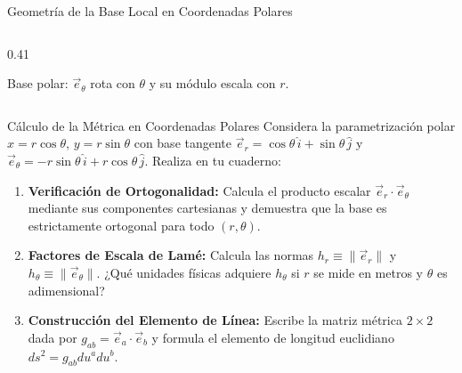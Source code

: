 \documentclass[10pt,aspectratio=169]{beamer}
\begin{document}
\begin{frame}{Geometría de la Base Local en Coordenadas Polares}
\begin{columns}[c]
\begin{column}{0.41\textwidth}
      \vspace{0.1cm}
      {\scriptsize Base polar: $\vec{e}_\theta$ rota con $\theta$ y su módulo escala con $r$.}
    \end{column}
  \end{columns}
\end{frame}

\begin{frame}{Cálculo de la Métrica en Coordenadas Polares}
  \vspace{0.05cm}
  Considera la parametrización polar $x = r\cos\theta$, $y = r\sin\theta$ con base tangente $\vec{e}_r = \cos\theta\,\hat{i} + \sin\theta\,\hat{j}$ y $\vec{e}_\theta = -r\sin\theta\,\hat{i} + r\cos\theta\,\hat{j}$. Realiza en tu cuaderno:
  \vspace{0.25cm}
  \begin{enumerate}\itemsep10pt
    \item[(a)] \textbf{Verificación de Ortogonalidad:} Calcula el producto escalar $\vec{e}_r \cdot \vec{e}_\theta$ mediante sus componentes cartesianas y demuestra que la base es estrictamente ortogonal para todo $(r, \theta)$.
    \item[(b)] \textbf{Factores de Escala de Lamé:} Calcula las normas $h_r \equiv \|\vec{e}_r\|$ y $h_\theta \equiv \|\vec{e}_\theta\|$. ¿Qué unidades físicas adquiere $h_\theta$ si $r$ se mide en metros y $\theta$ es adimensional?
    \item[(c)] \textbf{Construcción del Elemento de Línea:} Escribe la matriz métrica $2\times 2$ dada por $g_{ab} = \vec{e}_a \cdot \vec{e}_b$ y formula el elemento de longitud euclidiano $ds^2 = g_{ab}du^a du^b$.
  \end{enumerate}
\end{frame}
\end{document}
